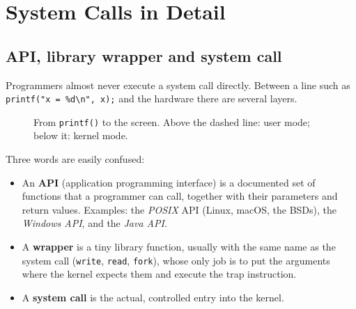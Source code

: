 \documentclass[11pt,a4paper]{article}
\newcommand{\term}[1]{\textbf{\color{mintdeep}#1}}
\newcommand{\cmd}[1]{\texttt{#1}}
\begin{document}
\section{System Calls in Detail}
\label{sec:syscalls}

\subsection{API, library wrapper and system call}

Programmers almost never execute a system call directly. Between a line such as \cmd{printf("x = \%d\textbackslash n", x);} and the hardware there are several layers.

\begin{figure}[H]
\centering
{}
\caption{From \cmd{printf()} to the screen. Above the dashed line: user mode; below it: kernel mode.}
\end{figure}

Three words are easily confused:

\begin{itemize}
  \item An \term{API} (application programming interface) is a documented set of functions that a programmer can call, together with their parameters and return values. Examples: the \emph{POSIX} API (Linux, macOS, the BSDs), the \emph{Windows API}, and the \emph{Java API}.
  \item A \term{wrapper} is a tiny library function, usually with the same name as the system call (\cmd{write}, \cmd{read}, \cmd{fork}), whose only job is to put the arguments where the kernel expects them and execute the trap instruction.
  \item A \term{system call} is the actual, controlled entry into the kernel.
\end{itemize}
\end{document}
